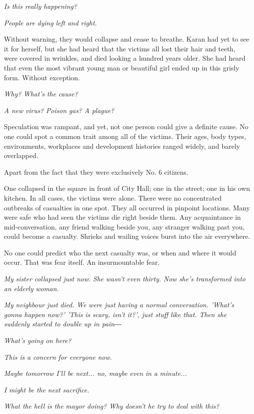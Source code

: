\emph{Is this really happening?}

\emph{People are dying left and right.}

Without warning, they would collapse and cease to breathe. Karan had yet
to see it for herself, but she had heard that the victims all lost their
hair and teeth, were covered in wrinkles, and died looking a hundred
years older. She had heard that even the most vibrant young man or
beautiful girl ended up in this grisly form. Without exception.

\emph{Why? What's the cause?}

\emph{A new virus? Poison gas? A plague?}

Speculation was rampant, and yet, not one person could give a definite
cause. No one could spot a common trait among all of the victims. Their
ages, body types, environments, workplaces and development histories
ranged widely, and barely overlapped.

Apart from the fact that they were exclusively No. 6 citizens.

One collapsed in the square in front of City Hall; one in the street;
one in his own kitchen. In all cases, the victims were alone. There were
no concentrated outbreaks of casualties in one spot. They all occurred
in pinpoint locations. Many were safe who had seen the victims die right
beside them. Any acquaintance in mid-conversation, any friend walking
beside you, any stranger walking past you, could become a casualty.
Shrieks and wailing voices burst into the air everywhere.

No one could predict who the next casualty was, or when and where it
would occur. That was fear itself. An insurmountable fear.

\emph{My sister collapsed just now. She wasn't even thirty. Now she's
	transformed into an elderly woman.}

\emph{My neighbour just died. We were just having a normal conversation.
	'What's gonna happen now?' 'This is scary, isn't it?', just stuff like
	that. Then she suddenly started to double up in pain―}

\emph{What's going on here?}

\emph{This is a concern for everyone now.}

\emph{Maybe tomorrow I'll be next... no, maybe even in a minute...}

\emph{I might be the next sacrifice.}

\emph{What the hell is the mayor doing? Why doesn't he try to deal with this?}

